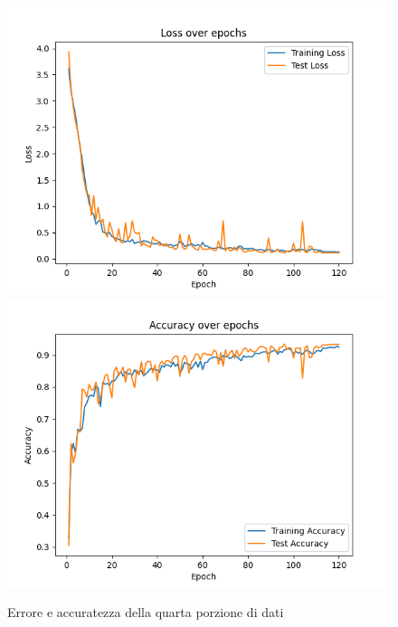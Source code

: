 \begin{figure}[!ht]
	\begin{adjustbox}{width=0.9\columnwidth, center}
    \includegraphics{./images/fold_3_loss.png} \includegraphics{./images/fold_3_accuracy.png}
  \end{adjustbox}
  \caption{Errore e accuratezza della quarta porzione di dati}
  \label{fig:loss e accuratezza della quarta porzione di dati}
\end{figure}


